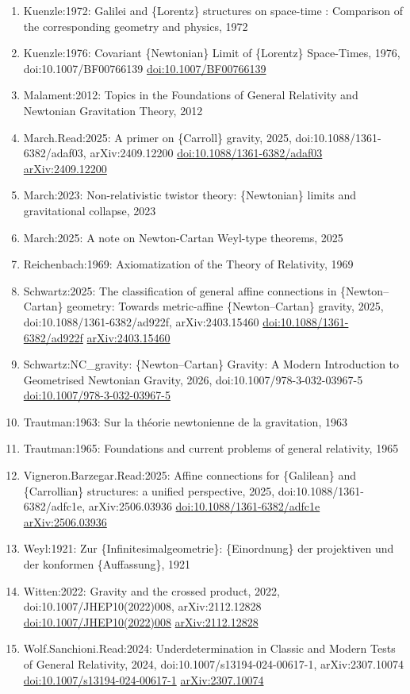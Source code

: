 \documentclass[11pt]{article}
\begin{document}
\begin{enumerate}[leftmargin=*]
  \item Kuenzle:1972: Galilei and \{Lorentz\} structures on space-time : Comparison of the corresponding geometry and physics, 1972
  \item Kuenzle:1976: Covariant \{Newtonian\} Limit of \{Lorentz\} Space-Times, 1976, doi:10.1007/BF00766139 \href{https://doi.org/10.1007/BF00766139}{doi:10.1007/BF00766139}
  \item Malament:2012: Topics in the Foundations of General Relativity and Newtonian Gravitation Theory, 2012
  \item March.Read:2025: A primer on \{Carroll\} gravity, 2025, doi:10.1088/1361-6382/adaf03, arXiv:2409.12200 \href{https://doi.org/10.1088/1361-6382/adaf03}{doi:10.1088/1361-6382/adaf03} \href{https://arxiv.org/abs/2409.12200}{arXiv:2409.12200}
  \item March:2023: Non-relativistic twistor theory: \{Newtonian\} limits and gravitational collapse, 2023
  \item March:2025: A note on Newton-Cartan Weyl-type theorems, 2025
  \item Reichenbach:1969: Axiomatization of the Theory of Relativity, 1969
  \item Schwartz:2025: The classification of general affine connections in \{Newton--Cartan\} geometry: Towards metric-affine \{Newton--Cartan\} gravity, 2025, doi:10.1088/1361-6382/ad922f, arXiv:2403.15460 \href{https://doi.org/10.1088/1361-6382/ad922f}{doi:10.1088/1361-6382/ad922f} \href{https://arxiv.org/abs/2403.15460}{arXiv:2403.15460}
  \item Schwartz:NC\_gravity: \{Newton--Cartan\} Gravity: A Modern Introduction to Geometrised Newtonian Gravity, 2026, doi:10.1007/978-3-032-03967-5 \href{https://doi.org/10.1007/978-3-032-03967-5}{doi:10.1007/978-3-032-03967-5}
  \item Trautman:1963: Sur la théorie newtonienne de la gravitation, 1963
  \item Trautman:1965: Foundations and current problems of general relativity, 1965
  \item Vigneron.Barzegar.Read:2025: Affine connections for \{Galilean\} and \{Carrollian\} structures: a unified perspective, 2025, doi:10.1088/1361-6382/adfc1e, arXiv:2506.03936 \href{https://doi.org/10.1088/1361-6382/adfc1e}{doi:10.1088/1361-6382/adfc1e} \href{https://arxiv.org/abs/2506.03936}{arXiv:2506.03936}
  \item Weyl:1921: Zur \{Infinitesimalgeometrie\}: \{Einordnung\} der projektiven und der konformen \{Auffassung\}, 1921
  \item Witten:2022: Gravity and the crossed product, 2022, doi:10.1007/JHEP10(2022)008, arXiv:2112.12828 \href{https://doi.org/10.1007/JHEP10(2022)008}{doi:10.1007/JHEP10(2022)008} \href{https://arxiv.org/abs/2112.12828}{arXiv:2112.12828}
  \item Wolf.Sanchioni.Read:2024: Underdetermination in Classic and Modern Tests of General Relativity, 2024, doi:10.1007/s13194-024-00617-1, arXiv:2307.10074 \href{https://doi.org/10.1007/s13194-024-00617-1}{doi:10.1007/s13194-024-00617-1} \href{https://arxiv.org/abs/2307.10074}{arXiv:2307.10074}
\end{enumerate}

% 
% 
\end{document}
